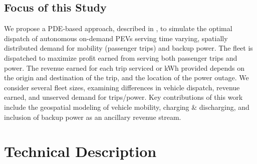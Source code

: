 \documentclass[conference]{IEEEtran}
\begin{document}
\subsection{Focus of this Study}
We propose a PDE-based approach, described in \cite{lefloch_pde_2016}, to simulate the optimal dispatch of autonomous on-demand PEVs serving time varying, spatially distributed demand for mobility (passenger trips) and backup power. The fleet is dispatched to maximize profit earned from serving both passenger trips and power. The revenue earned for each trip serviced or kWh provided depends on the origin and destination of the trip, and the location of the power outage. We consider several fleet sizes, examining differences in vehicle dispatch, revenue earned, and unserved demand for trips/power. Key contributions of this work include the geospatial modeling of vehicle mobility, charging \& discharging, and inclusion of backup power as an ancillary revenue stream.

\section{Technical Description}
\end{document}
